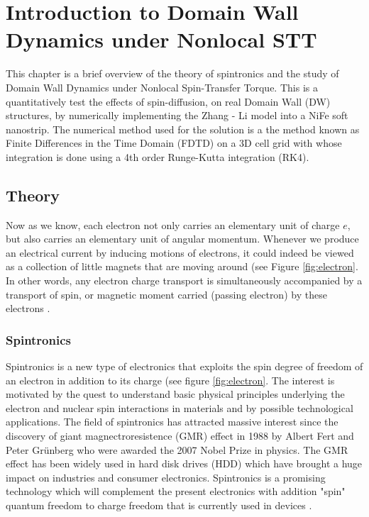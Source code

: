 
\chapter{Introduction to Domain Wall Dynamics under Nonlocal STT} %

\label{Introduction to Domain Wall Dynamics under Nonlocal STT} %



This chapter is a brief overview of the theory of spintronics and the study of Domain Wall Dynamics under Nonlocal Spin-Transfer Torque. This is a quantitatively test the effects of spin-diffusion, on real Domain Wall (DW) structures, by numerically implementing the Zhang - Li model into a NiFe soft nanostrip. The numerical method used for the solution is a the method known as Finite Differences in the Time Domain (FDTD) on a 3D cell grid with whose integration is done using a 4th order Runge-Kutta integration (RK4).

\section{Theory}

Now as we know, each electron not only carries an elementary
unit of charge $e$, but also carries an elementary unit of angular momentum. Whenever we produce an electrical current by inducing
motions of electrons, it could indeed be viewed as a collection of little magnets that are moving around (see Figure \ref{fig:electron}. In other words, any electron charge transport is simultaneously accompanied by a transport of spin, or magnetic moment carried (passing electron) by these electrons \cite{cornell}.


\subsection{Spintronics}

Spintronics is a new type of electronics that exploits the spin degree of freedom of an electron in addition to its charge \cite{spinz} (see figure \ref{fig:electron}. The interest is motivated by the quest to understand basic physical principles underlying the electron and nuclear spin interactions in materials and by possible technological applications. The field of spintronics has attracted massive interest since the discovery of giant magnectroresistence (GMR) effect in 1988 by Albert Fert and Peter Gr\"{u}nberg who were awarded the 2007 Nobel Prize in physics. The GMR effect has been widely used in hard disk drives (HDD) which have brought a huge impact on industries and consumer electronics. Spintronics is a promising technology which will complement the present electronics with addition "spin" quantum freedom to charge freedom that is currently used in devices \cite{nonlocalspin}.


